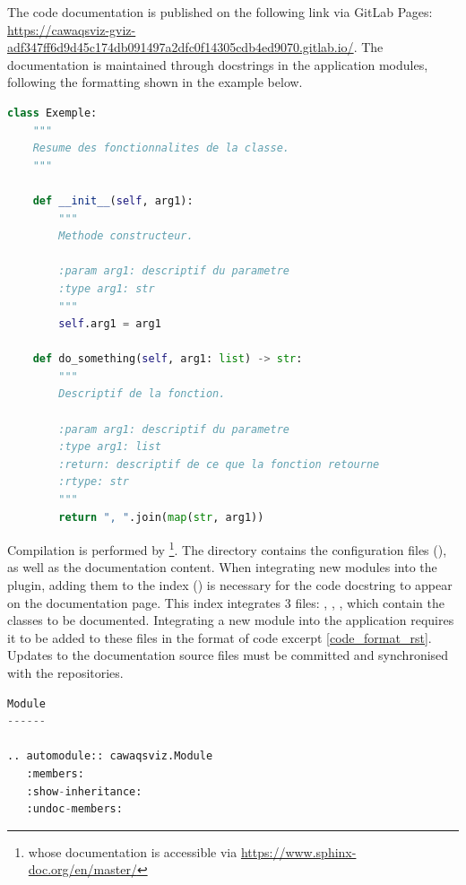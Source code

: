The code documentation is published on the following link via GitLab Pages: \href{https://cawaqsviz-gviz-adf347ff6d9d45c174db091497a2dfc0f14305cdb4ed9070.gitlab.io/}{https://cawaqsviz-gviz-adf347ff6d9d45c174db091497a2dfc0f14305cdb4ed9070.gitlab.io/}. The documentation is maintained through docstrings in the application modules, following the formatting shown in the example below. 


\begin{lstlisting}[language=Python, caption={Docstring formatting for automatic integration into code documentation}, label={code_format_docstrings}]
class Exemple:
    """
    Resume des fonctionnalites de la classe.
    """

    def __init__(self, arg1):
        """
        Methode constructeur.

        :param arg1: descriptif du parametre
        :type arg1: str
        """
        self.arg1 = arg1

    def do_something(self, arg1: list) -> str:
        """
        Descriptif de la fonction.

        :param arg1: descriptif du parametre
        :type arg1: list
        :return: descriptif de ce que la fonction retourne
        :rtype: str
        """
        return ", ".join(map(str, arg1))
\end{lstlisting}
\vspace{1em}
Compilation is performed by \footnote{whose documentation is accessible via \href{https://www.sphinx-doc.org/en/master/}{https://www.sphinx-doc.org/en/master/}}. The  directory contains the configuration files (), as well as the documentation content. 
When integrating new modules into the plugin, adding them to the index () is necessary for the code docstring to appear on the documentation page. This index integrates 3 files: , , , which contain the classes to be documented. Integrating a new module into the application requires it to be added to these files in the format of code excerpt \ref{code_format_rst}. Updates to the documentation source files must be committed and synchronised with the repositories. 

\begin{lstlisting}[language=Python,caption={Docstring formatting for automatic integration into code documentation}, label={code_format_rst}]
Module
------

.. automodule:: cawaqsviz.Module
   :members:
   :show-inheritance:
   :undoc-members:
\end{lstlisting}

